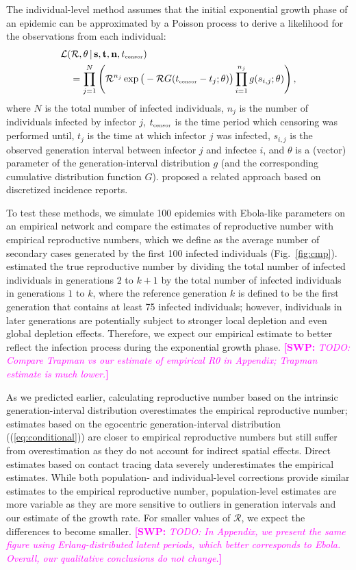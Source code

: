 \documentclass[12pt]{article}
\newcommand{\eref}[1]{(\ref{eq:#1})}
\newcommand{\fref}[1]{Fig.~\ref{fig:#1}}
\newcommand{\RR}{\ensuremath{{\mathcal R}}}
\newcommand{\tsub}[2]{#1_{{\textrm{\tiny #2}}}}
\newcommand{\comment}[3]{\textcolor{#1}{\textbf{[#2: }\textsl{#3}\textbf{]}}}
\newcommand{\swp}[1]{\comment{magenta}{SWP}{#1}}
\begin{document}
The individual-level method assumes that the initial exponential growth phase of an epidemic can be approximated by a Poisson process to derive a likelihood for the observations from each individual:
\begin{equation}
\begin{aligned}
&\mathcal{L}(\RR, \theta\,|\, \mathbf{s}, \mathbf{t}, \mathbf{n}, \tsub{t}{censor})\\
&\quad=\prod_{j=1}^N \left(\RR^{n_j} \exp \big(- \RR G(\tsub{t}{censor} - t_j ;\theta) \big) \prod_{i=1}^{n_j} g(s_{i, j}; \theta) \right),
\end{aligned}
\end{equation}
where $N$ is the total number of infected individuals, $n_j$ is the number of individuals infected by infector $j$, $\tsub{t}{censor}$ is the time period which censoring was performed until, $t_j$ is the time at which infector $j$ was infected, $s_{i,j}$ is the observed generation interval between infector $j$ and infectee $i$, and $\theta$ is a (vector) parameter of the generation-interval distribution $g$ (and the corresponding cumulative distribution function $G$).
\cite{forsberg2008likelihood} proposed a related approach based on discretized incidence reports.

To test these methods, we simulate 100 epidemics with Ebola-like parameters on an empirical network and compare the estimates of reproductive number with empirical reproductive numbers, which we define as the average number of secondary cases generated by the first 100 infected individuals (\fref{cmp}).
\cite{trapman2016inferring} estimated the true reproductive number by dividing the total number of infected individuals in generations $2$ to $k+1$ by the total number of infected individuals in generations $1$ to $k$, where the reference generation $k$ is defined to be the first generation that contains at least 75 infected individuals;
however, individuals in later generations are potentially subject to stronger local depletion and even global depletion effects.
Therefore, we expect our empirical estimate to better reflect the infection process during the exponential growth phase.
\swp{TODO: Compare Trapman vs our estimate of empirical R0 in Appendix; Trapman estimate is much lower.}

As we predicted earlier, calculating reproductive number based on the intrinsic generation-interval distribution overestimates the empirical reproductive number;
estimates based on the egocentric generation-interval distribution (\eref{conditional}) are closer to empirical reproductive numbers but still suffer from overestimation as they do not account for indirect spatial effects.
Direct estimates based on contact tracing data severely underestimates the empirical estimates.
While both population- and individual-level corrections provide similar estimates to the empirical reproductive number,
population-level estimates are more variable as they are more sensitive to outliers in generation intervals and our estimate of the growth rate.
For smaller values of \RR, we expect the differences to become smaller. 
\swp{TODO: In Appendix, we present the same figure using Erlang-distributed latent periods, which better corresponds to Ebola. Overall, our qualitative conclusions do not change.}
\end{document}
